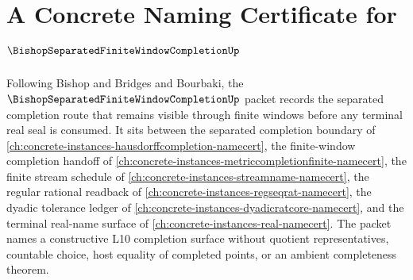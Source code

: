 \chapter{A Concrete Naming Certificate for $\BishopSeparatedFiniteWindowCompletionUp$}
\label{ch:concrete-instances-bishop-separated-finite-window-completion-namecert}

Following Bishop and Bridges and Bourbaki, the $\BishopSeparatedFiniteWindowCompletionUp$ packet records the separated completion route that remains visible through finite windows before any terminal real seal is consumed. It sits between the separated completion boundary of \autoref{ch:concrete-instances-hausdorffcompletion-namecert}, the finite-window completion handoff of \autoref{ch:concrete-instances-metriccompletionfinite-namecert}, the finite stream schedule of \autoref{ch:concrete-instances-streamname-namecert}, the regular rational readback of \autoref{ch:concrete-instances-regseqrat-namecert}, the dyadic tolerance ledger of \autoref{ch:concrete-instances-dyadicratcore-namecert}, and the terminal real-name surface of \autoref{ch:concrete-instances-real-namecert}. The packet names a constructive L10 completion surface without quotient representatives, countable choice, host equality of completed points, or an ambient completeness theorem.

